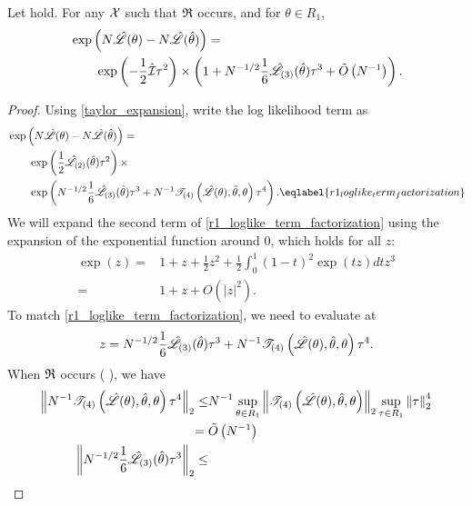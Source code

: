\begin{lem}
%
Let  hold.  For any ${\mathcal{X}}$ such that $\mathfrak{R}$
occurs, and for $\theta \in R_1$,
%
\begin{align*}
%
\MoveEqLeft
\exp\left(N \likhat(\theta) - N \likhat(\thetahat)\right) = \\
& \exp\left(-\frac{1}{2} \infohat \tau^2 \right) \times
\left( 1 + N^{-1/2} \frac{1}{6} \likhatk{3}(\thetahat) \tau^3 +
    \ordlog{N^{-1}} \right).
%
\end{align*}
%
\begin{proof}
%

Using \eqref{taylor_expansion}, write the log likelihood term as
%
\begin{align}
%
\MoveEqLeft
\exp\left(N \likhat(\theta) - N \likhat(\thetahat)\right) =  \nonumber \\
& \exp\left(\frac{1}{2} \likhatk{2}(\thetahat) \tau^2 \right) \times \nonumber \\
& \exp\left(
        N^{-1/2} \frac{1}{6} \likhatk{3}(\thetahat) \tau^3 +
        N^{-1} \tresid{4}{\likhat(\theta), \thetahat, \theta} \tau^4
    \right). \eqlabel{r1_loglike_term_factorization}
%
\end{align}
%
We will expand the second term of \eqref{r1_loglike_term_factorization} using
the expansion of the  exponential function around 0, which holds for all
$z$:
%
\begin{align*}
\exp(z) ={}& 1 + z + \frac{1}{2} z^2 + \frac{1}{2} \int_0^1 (1 - t)^2 \exp(tz) dt z^3 \\
={}& 1 + z + O(|z|^2).
\end{align*}
%
To match \eqref{r1_loglike_term_factorization}, we need to evaluate at
%
\begin{align*}
%
z = N^{-1/2} \frac{1}{6} \likhatk{3}(\thetahat) \tau^3 +
    N^{-1} \tresid{4}{\likhat(\theta), \thetahat, \theta} \tau^4.
%
\end{align*}
%
When $\mathfrak{R}$ occurs ( ), we
have
%
\begin{align*}
%
\norm{N^{-1} \tresid{4}{\likhat(\theta), \thetahat, \theta} \tau^4}_2 \le&
N^{-1} \sup_{\theta \in R_1}
    \norm{\tresid{4}{\likhat(\theta), \thetahat, \theta}}_2
    \sup_{\tau \in R_1}\norm{\tau}_2^4 \\
={}& \ordlog{N^{-1}}\\
%
\norm{N^{-1/2} \frac{1}{6} \likhatk{3}(\thetahat) \tau^3}_2 \le&

\end{align*}
\end{proof}
\end{lem}
